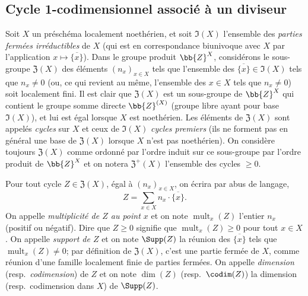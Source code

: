 \subsection{Cycle 1-codimensionnel associé à un diviseur}
\label{subsection:IV.21.6}
\label{IV.21.6}

\begin{env}[21.6.1]
\label{IV.21.6.1}
Soit $X$ un préschéma localement noethérien, et soit $\mathfrak{I}(X)$ l'ensemble des \emph{parties fermées irréductibles} de $X$ (qui est en correspondance biunivoque avec $X$ par l'application $x\mapsto\overline{\{x\}}$).
Dans le groupe produit $\bb{Z}^X$, considérons le sous-groupe $\mathfrak{Z}(X)$ des éléments $(n_x)_{x\in X}$ tels que l'ensemble des $\overline{\{x\}}\in\mathfrak{I}(X)$ tels que $n_x\neq0$ (ou, ce qui revient au même, l'ensemble des $x\in X$ tels que $n_x\neq0$) soit localement fini.
Il est clair que $\mathfrak{Z}(X)$ est un sous-groupe de $\bb{Z}^X$ qui contient le groupe somme directe $\bb{Z}^{(X)}$ (groupe libre ayant pour base $\mathfrak{I}(X)$), et lui est égal lorsque $X$ est noethérien.
Les éléments de $\mathfrak{Z}(X)$ sont appelés \emph{cycles} sur $X$ et ceux de $\mathfrak{I}(X)$ \emph{cycles premiers} (ils ne forment pas en général une base de $\mathfrak{Z}(X)$ lorsque $X$ n'est pas noethérien).
On considère toujours $\mathfrak{Z}(X)$ comme ordonné par l'ordre induit sur ce sous-groupe par l'ordre produit de $\bb{Z}^X$ et on notera $\mathfrak{Z}^+(X)$ l'ensemble des cycles $\geq0$.


Pour tout cycle $Z\in\mathfrak{Z}(X)$, égal à $(n_x)_{x\in X}$, on écrira par abus de langage,
\[
  Z=\sum_{x\in X}n_x\cdot\overline{\{x\}}.
\]
On appelle \emph{multiplicité de $Z$ au point $x$} et on note $\operatorname{mult}_x(Z)$ l'entier $n_x$ (positif ou négatif).
Dire que $Z\geq0$ signifie que $\operatorname{mult}_x(Z)\geq0$ pour tout $x\in X$.
On appelle \emph{support de $Z$} et on note $\Supp(Z)$ la réunion des $\overline{\{x\}}$ tels que $\operatorname{mult}_x(Z)\neq0$;
par définition de $\mathfrak{Z}(X)$, c'est une partie fermée de $X$, comme réunion d'une famille localement finie de parties fermées.
On appelle \emph{dimension} (resp.\ \emph{codimension}) de $Z$ et on note $\dim(Z)$ (resp.\ $\codim(Z)$) la dimension (resp.\ codimension dans $X$) de $\Supp(Z)$.
\end{env}

